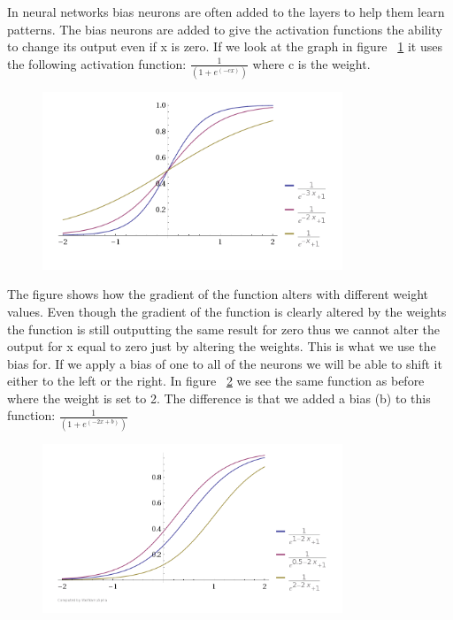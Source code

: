 In neural networks bias neurons are often added to the layers to help them learn patterns. The bias neurons are added to give the activation functions the ability to change its output even if x is zero. If we look at the graph in figure ~\ref{fig:activationFunctions} it uses the following activation function: \begin{math} \frac{1}{(1+e^{(-cx)})} \end{math} where c is the weight.

\begin{figure}[weight!]
\centering
\includegraphics[width=0.8\textwidth ,natwidth=410,natheight=237]{billeder/ActivationFunctions.png}
\caption{}
\label{fig:activationFunctions}
\end{figure}

The figure shows how the gradient of the function alters with different weight values. Even though the gradient of the function is clearly altered by the weights the function is still outputting the same result for zero thus we cannot alter the output for x equal to zero just by altering the weights. This is what we use the bias for. If we apply a bias of one to all of the neurons we will be able to shift it either to the left or the right. In figure ~\ref{fig:activationFunctionsWithBias} we see the same function as before where the weight is set to 2. The difference is that we added a bias (b) to this function: \begin{math} \frac{1}{(1+e^{(-2x+b)})} \end{math} \cite[p. 165]{rojas1996neural} \cite{inductiveBias}

\begin{figure}[weight!]
\centering
\includegraphics[width=0.8\textwidth ,natwidth=410,natheight=237]{billeder/ActivationFunctionsWithBias.png}
\caption{}
\label{fig:activationFunctionsWithBias}
\end{figure}

